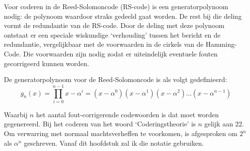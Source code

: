 \documentclass[a4paper]{article}
\begin{document}
Voor coderen in de Reed-Solomoncode (RS-code) is een generatorpolynoom nodig: de polynoom waardoor straks gedeeld gaat worden. De rest bij die deling vormt de redundantie van de RS-code. Door de deling met deze polynoom ontstaat er een speciale wiskundige `verhouding' tussen het bericht en de redundantie, vergelijkbaar met de voorwaarden in de cirkels van de Hamming-Code. Die voorwaarden zijn nodig zodat er uiteindelijk eventuele fouten gecorrigeerd kunnen worden.

De generatorpolynoom voor de Reed-Solomoncode is als volgt gedefinieerd:
$$g_n(x)=\prod\limits_{i=0}^{n-1} x-\alpha^i = (x-\alpha^0)(x-\alpha^1)(x-\alpha^2) ... (x-\alpha^{n-1})$$

Waarbij $n$ het aantal fout-corrigerende codewoorden is dat moet worden gegenereerd. Bij het coderen van het woord `Coderingstheorie' is $n$ gelijk aan 22. Om verwarring met normaal machtsverheffen te voorkomen, is afgesproken om $2^n$ als $\alpha^n$ geschreven. Vanaf dit hoofdstuk zal ik die notatie gebruiken.
\end{document}
